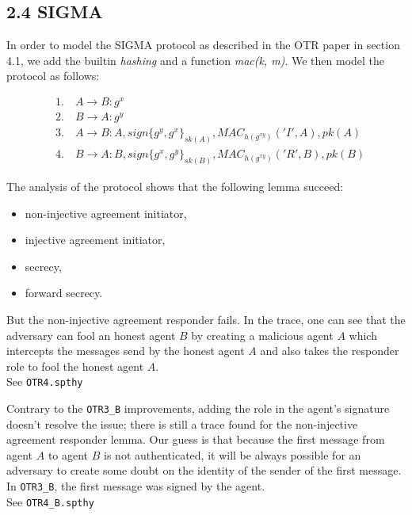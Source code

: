 \documentclass[
]{article}
\begin{document}
\newpage
\hypertarget{sigma}{%
\subsection{2.4 SIGMA}\label{sigma}}

In order to model the SIGMA protocol as described in the OTR paper in section 4.1, we add the builtin \emph{hashing} and a function \emph{mac(k, m)}. We then model the protocol as follows:

\begin{align*}
&\text{1.} \quad A \rightarrow B: g^x \\
&\text{2.} \quad B \rightarrow A: g^y \\
&\text{3.} \quad A \rightarrow B: A, sign\{g^y, g^x\}_{sk(A)}, MAC_{h(g^{xy})}('I', A), pk(A) \\
&\text{4.} \quad B \rightarrow A: B, sign\{g^x, g^y\}_{sk(B)}, MAC_{h(g^{xy})}('R', B), pk(B)
\end{align*}

The analysis of the protocol shows that the following lemma succeed:

\begin{itemize}
    \item non-injective agreement initiator,
    \item injective agreement initiator,
    \item secrecy,
    \item forward secrecy.
\end{itemize}

But the non-injective agreement responder fails. In the trace, one can see that the adversary can fool an honest agent $B$ by creating a malicious agent $A$ which intercepts the messages send by the honest agent $A$ and also takes the responder role to fool the honest agent $A$.\\
See \texttt{OTR4.spthy}

Contrary to the \texttt{OTR3\_B} improvements, adding the role in the agent's signature doesn't resolve the issue; there is still a trace found for the non-injective agreement responder lemma. Our guess is that because the first message from agent $A$ to agent $B$ is not authenticated, it will be always possible for an adversary to create some doubt on the identity of the sender of the first message. In \texttt{OTR3\_B}, the first message was signed by the agent.\\
See \texttt{OTR4\_B.spthy}
\end{document}
